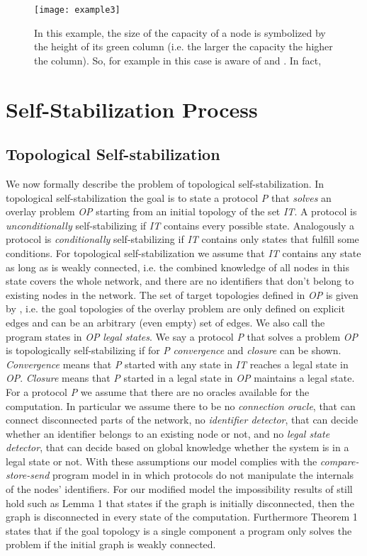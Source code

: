 \documentclass[11pt]{article}
\begin{document}
\begin{figure}[htb]

\caption{In this example, the size of the capacity of a node is symbolized by the height of its green column (i.e. the larger the capacity the higher the column). So, for example in this case  is aware of  and . In fact,    }

\texttt{[image: example3]}\label{example3}
\end{figure}
\section{Self-Stabilization Process}\label{alg}

\subsection{Topological Self-stabilization}
We now formally describe the problem of topological self-stabilization. In topological self-stabilization the goal is to state a protocol \emph{P} that \emph{solves} an overlay problem \emph{OP} starting from an initial topology of the set \emph{IT}. A protocol is \emph{unconditionally} self-stabilizing if \emph{IT} contains every possible state. Analogously a protocol is \emph{conditionally} self-stabilizing if \emph{IT} contains only states that fulfill some conditions. For topological self-stabilization we assume that \emph{IT} contains any state as long as  is weakly connected, i.e. the combined knowledge of all nodes in this state covers the whole network, and there are no identifiers that don't belong to existing nodes in the network.
The set of target topologies defined in \emph{OP} is given by , i.e. the goal topologies of the overlay problem are only defined on explicit edges and  can be an arbitrary (even empty) set of edges. We also call the program states in \emph{OP} \emph{legal states}. We say a protocol \emph{P} that solves a problem \emph{OP} is topologically self-stabilizing if for \emph{P} \emph{convergence} and \emph{closure} can be shown. \emph{Convergence} means that \emph{P} started with any state in \emph{IT} reaches a legal state in \emph{OP}. \emph{Closure} means that \emph{P} started in a legal state in \emph{OP} maintains a legal state.
For a protocol \emph{P} we assume that there are no oracles available for the computation. In particular we assume there to be no \emph{connection oracle}, that can connect disconnected parts of the network, no \emph{identifier detector}, that can decide whether an identifier belongs to an existing node or not, and no \emph{legal state detector}, that can decide based on global knowledge whether the system is in a legal state or not.
With these assumptions our model complies with the \emph{compare-store-send} program model in \cite{NNS11:corona} in which protocols do not manipulate the internals of the nodes' identifiers. For our modified model the impossibility results of \cite{NNS11:corona} still hold such as Lemma 1 that states if the graph  is initially disconnected, then the graph is disconnected in every state of the computation. Furthermore Theorem 1 states that if the goal topology is a single component a program only solves the problem if the initial graph is weakly connected.
\end{document}
